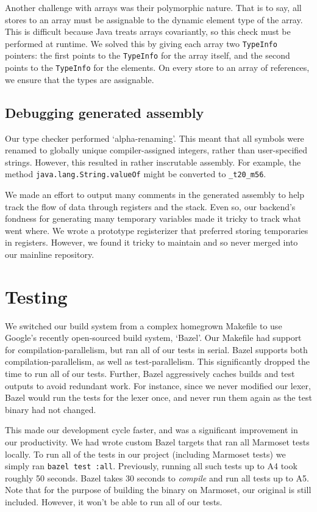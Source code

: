 \documentclass[12pt, titlepage]{article}
\newcommand{\z}[1]{\texttt{#1}}
\begin{document}
Another challenge with arrays was their polymorphic nature. That is to say, all
stores to an array must be assignable to the dynamic element type of the array.
This is difficult because Java treats arrays covariantly, so this check must be
performed at runtime. We solved this by giving each array two \z{TypeInfo}
pointers: the first points to the \z{TypeInfo} for the array itself, and the
second points to the \z{TypeInfo} for the elements. On every store to an array
of references, we ensure that the types are assignable.

\subsection{Debugging generated assembly}
Our type checker performed `alpha-renaming'. This meant that all symbols were
renamed to globally unique compiler-assigned integers, rather than
user-specified strings. However, this resulted in rather inscrutable assembly.
For example, the method \z{java.lang.String.valueOf} might be converted to
\z{\_t20\_m56}.

We made an effort to output many comments in the generated assembly to help
track the flow of data through registers and the stack. Even so, our backend's
fondness for generating many temporary variables made it tricky to track what
went where. We wrote a prototype registerizer that preferred storing
temporaries in registers. However, we found it tricky to maintain and so never
merged into our mainline repository.

\section{Testing}

We switched our build system from a complex homegrown Makefile to use Google's
recently open-sourced build system, `Bazel'. Our Makefile had support for
compilation-parallelism, but ran all of our tests in serial. Bazel supports
both compilation-parallelism, as well as test-parallelism. This significantly
dropped the time to run all of our tests. Further, Bazel aggressively caches
builds and test outputs to avoid redundant work. For instance, since we never
modified our lexer, Bazel would run the tests for the lexer once, and never run
them again as the test binary had not changed.

This made our development cycle faster, and was a significant improvement in
our productivity. We had wrote custom Bazel targets that ran all Marmoset tests
locally. To run all of the tests in our project (including Marmoset tests) we
simply ran \z{bazel test :all}. Previously, running all such tests up to A4
took roughly 50 seconds. Bazel takes 30 seconds to \emph{compile} and run all
tests up to A5. Note that for the purpose of building the binary on Marmoset,
our original is still included. However, it won't be able to run all of our
tests.
\end{document}
